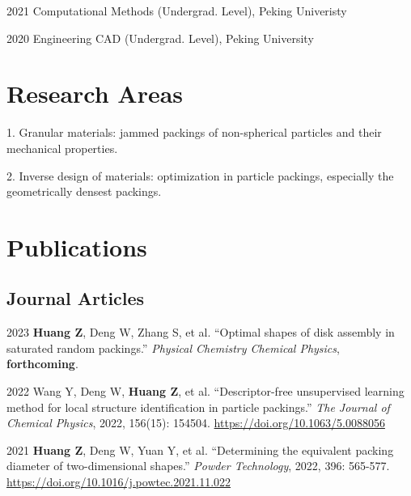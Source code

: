 \documentclass[12pt,letterpaper]{report}
\newcommand{\listitemspace}{0.25em}
\renewenvironment{itemize}
{\begin{list}{}{\setlength{\leftmargin}{0em}
                \setlength{\parskip}{0em}
                \setlength{\itemsep}{\listitemspace}
                \setlength{\parsep}{\listitemspace}}}
{\end{list}}
\begin{document}
	\begin{tablist}

		\item[2021] \tab{}Computational Methods (Undergrad. Level), Peking Univeristy

		\item[2020] \tab{}Engineering CAD (Undergrad. Level), Peking University

	\end{tablist}

    \section*{Research Areas}

    \begin{itemize}

        \item 1. Granular materials: jammed packings of non-spherical particles and their mechanical properties.
        \item 2. Inverse design of materials: optimization in particle packings, especially the geometrically densest packings.

    \end{itemize}

	\section*{Publications}
	
	\subsection*{Journal Articles}
	
	\begin{tablist}
		
		\item[2023] \tab{}\textbf{Huang Z}, Deng W, Zhang S, et al. \enquote{Optimal shapes of disk assembly in saturated random packings.} \textit{Physical Chemistry Chemical Physics}, \textbf{forthcoming}.
		
		\item[2022] \tab{}Wang Y, Deng W, \textbf {Huang Z}, et al. \enquote{Descriptor-free unsupervised learning method for local structure identification in particle packings.} \textit{The Journal of Chemical Physics}, 2022, 156(15): 154504. \href{https://doi.org/10.1063/5.0088056}{https://doi.org/10.1063/5.0088056}
		
		\item[2021] \tab{}\textbf{Huang Z}, Deng W, Yuan Y, et al. \enquote{Determining the equivalent packing diameter of two-dimensional shapes.} \textit{Powder Technology}, 2022, 396: 565-577. \href{https://doi.org/10.1016/j.powtec.2021.11.022}{https://doi.org/10.1016/j.powtec.2021.11.022}
		
		
	\end{tablist}
	
\end{document}
